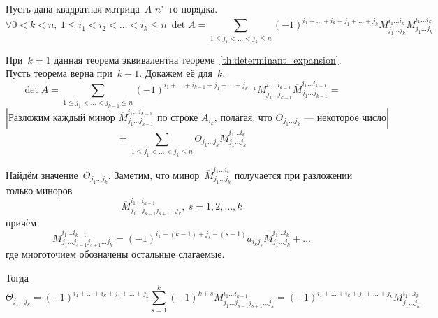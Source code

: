 \begin{theorem}[Лапл\'{а}са]
Пусть дана квадратная матрица~$A$ $n$"~го порядка.
\begin{equation*}
\forall 0 < k < n, \ 1 \leqslant i_1 < i_2 < \ldots < i_k \leqslant n \
\det A = \sum_{1 \leqslant j_1 < \ldots < j_k \leqslant n}
(-1)^{i_1 + \ldots + i_k + j_1 + \ldots + j_k}
M_{j_1 \ldots j_k}^{i_1 \ldots i_k}
\overline M_{j_1 \ldots j_k}^{i_1 \ldots i_k}
\end{equation*}
\end{theorem}
\begin{proofmathind}
	\indbase При~$k = 1$ данная теорема эквивалентна теореме~\ref*{th:determinant_expansion}.
	\indstep Пусть теорема верна при~$k - 1$. Докажем её для~$k$.
	\begin{equation*}
	\det A = \sum_{1 \leqslant j_1 < \ldots < j_{k-1} \leqslant n}
	(-1)^{i_1 + \ldots + i_{k-1} + j_1 + \ldots + j_{k-1}}
	M_{j_1 \ldots j_{k-1}}^{i_1 \ldots i_{k-1}}
	\overline M_{j_1 \ldots j_{k-1}}^{i_1 \ldots i_{k-1}} =
	\end{equation*}
	\begin{equation*}
	\left| \text{Разложим каждый минор~$\overline M_{j_1 \ldots j_{k-1}}^{i_1 \ldots i_{k-1}}$ по строке~$A_{i_k}$, полагая, что $\Theta_{j_1 \ldots j_k}$~--- некоторое число} \right|
	\end{equation*}
	\begin{equation*}
	= \sum_{1 \leqslant j_1 < \ldots < j_k \leqslant n}
	\Theta_{j_1 \ldots j_k} \overline M_{j_1 \ldots j_k}^{i_1 \ldots i_k}
	\end{equation*}
	
	Найдём значение~$\Theta_{j_1 \ldots j_k}$.
	Заметим, что минор~$\overline M_{j_1 \ldots j_k}^{i_1 \ldots i_k}$ получается при разложении только миноров
	\begin{equation*}
	\overline M_{j_1 \ldots j_{s-1} j_{s+1} \ldots j_k}^{i_1 \ldots i_{k-1}}, \ s = 1, 2, \ldots, k
	\end{equation*}
	причём
	\begin{equation*}
	\overline M_{j_1 \ldots j_{s-1} j_{s+1} \ldots j_k}^{i_1 \ldots i_{k-1}} =
	(-1)^{i_k - (k - 1) + j_s - (s - 1)} a_{i_k j_s}
	\overline M_{j_1 \ldots j_k}^{i_1 \ldots i_k} + \ldots
	\end{equation*}
	где многоточием обозначены остальные слагаемые.
	
	Тогда
	\begin{equation*}
	\Theta_{j_1 \ldots j_k} =
	(-1)^{i_1 + \ldots + i_k + j_1 + \ldots + j_k}
	\sum_{s=1}^k (-1)^{k+s} M_{j_1 \ldots j_{s-1} j_{s+1} \ldots j_k}^{i_1 \ldots i_{k-1}} =
	(-1)^{i_1 + \ldots + i_k + j_1 + \ldots + j_k}
	M_{j_1 \ldots j_k}^{i_1 \ldots i_k}
	\end{equation*}
	\indend
\end{proofmathind}

